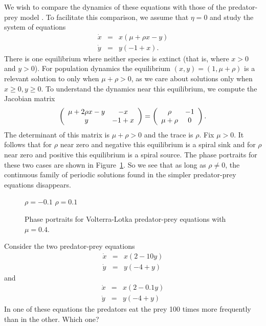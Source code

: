 We wish to compare the dynamics of these equations with those of 
the predator-prey model . To facilitate this 
comparison, we assume that $\eta=0$ and study the system of 
equations
\begin{equation*} \label{e:pop3}
\begin{array}{rcl}
\dot{x} & = & x(\mu + \rho x -       y) \\
\dot{y} & = & y( -1 +       x).
\end{array}
\end{equation*}
There is one equilibrium where neither species 
is extinct
(that is, where $x>0$ and $y>0$).  For population dynamics the 
equilibrium $(x,y)=(1,\mu+\rho)$ is a relevant solution to 
 only when $\mu+\rho>0$, as we care about solutions only 
when $x\geq0, y\geq 0$.  To understand the dynamics near this
equilibrium, we compute the Jacobian matrix
\[
\left(\begin{array}{cc} \mu + 2\rho x-y  & -x\\ y &-1+x\end{array}\right) = 
\left(\begin{array}{cc} \rho & -1\\ \mu+\rho &0\end{array}\right).
\]
The determinant of this matrix is $\mu+\rho>0$ and 
the trace is $\rho$.  Fix $\mu>0$.   It follows that for 
$\rho$ near zero and negative this equilibrium is a spiral 
sink and for $\rho$ near zero and positive this 
equilibrium is a spiral source.  The
phase portraits for these two cases are shown in
Figure~\ref{F:pop3}.  So we see that as long as $\rho\neq 0$,
the continuous family of periodic solutions found in the simpler
predator-prey equations  disappears.


\begin{figure}[htb]
           \centerline{%
	   }
		\vspace*{-0.2in}		
		\hspace{1.0in} $\rho=-0.1$ \hspace{2.5in} $\rho=0.1$
           \caption{Phase portraits for Volterra-Lotka predator-prey 
		equations \protect{} with $\mu=0.4$.}
           \label{F:pop3}
\end{figure}

\EXER

\TEXER

\begin{exercise} \label{c9.1.5}
Consider the two predator-prey equations
\begin{equation} \label{E:prpr1}
\begin{array}{rcl}
\dot{x} & = & x(2-10y)\\
\dot{y} & = & y(-4+y)
\end{array}
\end{equation}
and 
\begin{equation} \label{E:prpr2}
\begin{array}{rcl}
\dot{x} & = & x(2-0.1y)\\
\dot{y} & = & y(-4+y)
\end{array}
\end{equation}
In one of these equations the predators eat the prey 100 times more 
frequently than in the other.  Which one?
\end{exercise}

